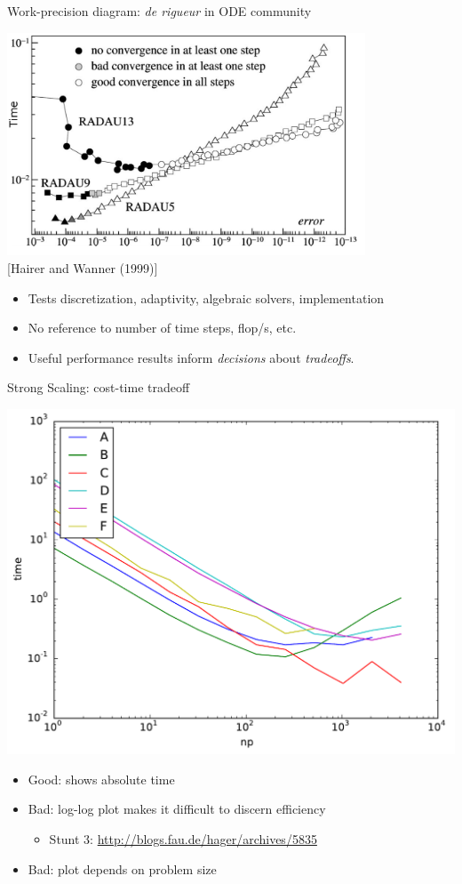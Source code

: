 \documentclass{beamer}
\begin{document}
\begin{frame}{Work-precision diagram: \emph{de rigueur} in ODE community}
  \begin{center}
    \includegraphics[width=0.8\textwidth]{figures/HairerWanner-WorkPrecision.png}\\
    {\scriptsize [Hairer and Wanner (1999)]}
  \end{center}
  \begin{itemize}
  \item Tests discretization, adaptivity, algebraic solvers, implementation
  \item No reference to number of time steps, flop/s, etc.
  \item Useful performance results inform \emph{decisions} about \emph{tradeoffs}.
  \end{itemize}
\end{frame}

\begin{frame}{Strong Scaling: cost-time tradeoff}
  \begin{center}
    \includegraphics[width=.75\textwidth]{figures/olenz/olenz-time-np}
  \end{center}
  \vspace{-1em}
  \begin{itemize}
  \item Good: shows absolute time
  \item Bad: log-log plot makes it difficult to discern efficiency
    \begin{itemize}
    \item Stunt 3: \url{http://blogs.fau.de/hager/archives/5835}
    \end{itemize}
  \item Bad: plot depends on problem size
  \end{itemize}
\end{frame}
\end{document}

